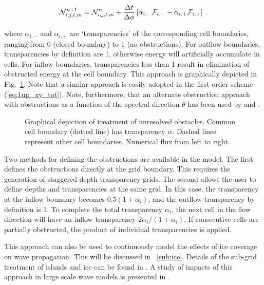 
\begin{equation}
{\cal N}_{i,j,l,m}^{n+1} = {\cal N}_{i,j,l,m}^n +
\frac{\Delta t}{\Delta \phi} \left [ \alpha_{i,-} {\cal F}_{i,-} - \alpha_{i,+} {\cal F}_{i,+} \right ]
\: . \label{eq:uq_xy_obstr} \end{equation}

\noindent
where $\alpha_{i,-}$ and $\alpha_{i,+}$ are `transparencies' of the
corresponding cell boundaries, ranging from 0 (closed boundary) to 1 (no
obstructions). For outflow boundaries, transparencies by definition are 1,
otherwise energy will artificially accumulate in cells. For inflow boundaries,
transparencies less than 1 result in elimination of obstructed energy at the
cell boundary. This approach is graphically depicted in
Fig.~\ref{fig:obstr}. Note that a similar approach is easily adopted in the
first order scheme (\ref{eq:1up_xy_tot}). Note, furthermore, that an alternate
obstruction approach with obstructions as a function of the spectral direction
$\theta$ has been used by \cite{art:HY96} and \cite{art:HMM00}.

\begin{figure} \begin{center}
\caption{Graphical depiction of treatment of unresolved obstacles. Common cell
         boundary (dotted line) has transparency $\alpha$. Dashed lines
         represent other cell boundaries. Numerical flux from left to right.}
         \label{fig:obstr} \botline
\end{center}
\end{figure}

Two methods for defining the obstructions are available in the model. The
first defines the obstructions directly at the grid boundary. This requires
the generation of staggered depth-transparency grids. The second allows the
user to define depths and transparencies at the same grid. In this case, the
transparency at the inflow boundary becomes $0.5(1+\alpha_i)$, and the outflow
transparency by definition is 1. To complete the total transparency
$\alpha_i$, the next cell in the flow direction will have an inflow
transparency $2\alpha_i/(1+\alpha_i)$. If consecutive cells are partially
obstructed, the product of individual transparencies is applied.

This approach can also be used to continuously model the effects of ice
coverage on wave propagation. This will be discussed in \para~\ref{sub:ice}.
Details of the sub-grid treatment of islands and ice can be found in
\cite{tol:OMOD03a}. A study of impacts of this approach in large scale wave
models is presented in \cite{tol:OMB02b,tol:OMOD03a}.

